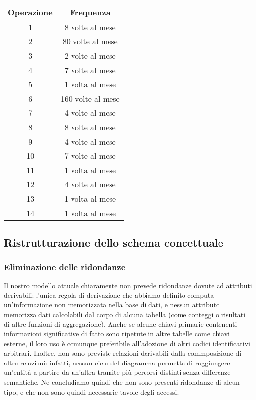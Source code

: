 \documentclass{article}
\begin{document}
\begin{center}\begin{tabular}{ |c|c| }
		\hline
		\textbf{Operazione} & \textbf{Frequenza} \\
		\hline
		1                   & 8 volte al mese    \\
		\hline
		2                   & 80 volte al mese   \\
		\hline
		3                   & 2 volte al mese    \\
		\hline
		4                   & 7 volte al mese    \\
		\hline
		5                   & 1 volta al mese    \\
		\hline
		6                   & 160 volte al mese  \\
		\hline
		7                   & 4 volte al mese    \\
		\hline
		8                   & 8 volte al mese    \\
		\hline
		9                   & 4 volte al mese    \\
		\hline
		10                  & 7 volte al mese    \\
		\hline
		11                  & 1 volta al mese    \\
		\hline
		12                  & 4 volte al mese    \\
		\hline
		13                  & 1 volta al mese    \\
		\hline
		14                  & 1 volta al mese    \\
		\hline
	\end{tabular}\end{center}

\subsection{Ristrutturazione dello schema concettuale}

\subsubsection{Eliminazione delle ridondanze}

Il nostro modello attuale chiaramente non prevede ridondanze dovute ad attributi
derivabili: l'unica regola di derivazione che abbiamo definito computa
un'informazione non memorizzata nella base di dati, e nessun attributo memorizza
dati calcolabili dal corpo di alcuna tabella (come conteggi o risultati di altre
funzioni di aggregazione). Anche se alcune chiavi primarie contenenti
informazioni significative di fatto sono ripetute in altre tabelle come chiavi
esterne, il loro uso è comunque preferibile all'adozione di altri codici
identificativi arbitrari. Inoltre, non sono previste relazioni derivabili dalla
commposizione di altre relazioni: infatti, nessun ciclo del diagramma permette
di raggiungere un'entità a partire da un'altra tramite più percorsi distinti
senza differenze semantiche. Ne concludiamo quindi che non sono presenti
ridondanze di alcun tipo, e che non sono quindi necessarie tavole degli accessi.
\end{document}
